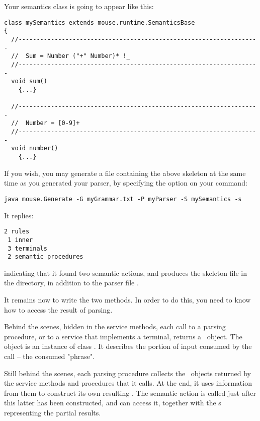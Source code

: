 Your semantics class is going to appear like this:

\small
\begin{Verbatim}[frame=single,framesep=2mm,samepage=true,xleftmargin=15mm,xrightmargin=15mm,baselinestretch=0.8]
class mySemantics extends mouse.runtime.SemanticsBase
{
  //-------------------------------------------------------------------
  //  Sum = Number ("+" Number)* !_
  //-------------------------------------------------------------------
  void sum()
    {...}
  
  //-------------------------------------------------------------------
  //  Number = [0-9]+
  //-------------------------------------------------------------------
  void number()
    {...}
\end{Verbatim}
\normalsize

\newpage
If you wish, you may generate a file containing the above skeleton at the same time as you generated your parser,
by specifying the option  on your command:

\small
\begin{Verbatim}[samepage=true,xleftmargin=15mm,baselinestretch=0.8]
 java mouse.Generate -G myGrammar.txt -P myParser -S mySemantics -s
\end{Verbatim}
\normalsize

It replies:

\small
\begin{Verbatim}[samepage=true,xleftmargin=15mm,baselinestretch=0.8]
 2 rules
 1 inner
 3 terminals
 2 semantic procedures
\end{Verbatim}
\normalsize

indicating that it found two semantic actions,
and produces the skeleton file  in the  directory,
in addition to the parser file .

It remains now to write the two methods.
In order to do this, you need to know how to access the result of parsing. 

Behind the scenes, hidden in the service methods,
each call to a parsing procedure,
or to a service that implements a terminal,
returns a \Phrase\ object. 
The object is an instance of class \Phrase.
It describes the portion of input consumed
by the call -- the consumed "phrase".

Still behind the scenes, each parsing procedure collects 
the \Phrase\ objects returned
by the service methods and procedures that it calls.
At the end, it uses information from them
to construct its own resulting \Phrase.
The semantic action is called just after this latter
has been constructed, and can access it, together
with the \Phrase s representing the partial results.

